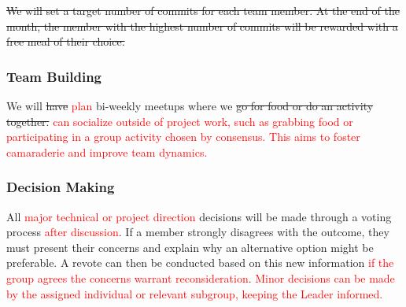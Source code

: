 \documentclass{article}
\begin{document}
\sout{We will set a target number of commits for each team member. At the end of the month, the member with the highest number of commits will be rewarded with a free meal of their choice.}

\subsubsection*{Team Building}
We will \sout{have} \textcolor{red}{plan} bi-weekly meetups where we \sout{go for food or do an activity together.} \textcolor{red}{can socialize outside of project work, such as grabbing food or participating in a group activity chosen by consensus. This aims to foster camaraderie and improve team dynamics.}

\subsubsection*{Decision Making}
All \textcolor{red}{major technical or project direction} decisions will be made through a voting process \textcolor{red}{after discussion}. If a member strongly disagrees with the outcome, they must present their concerns and explain why an alternative option might be preferable. A revote can then be conducted based on this new information \textcolor{red}{if the group agrees the concerns warrant reconsideration}. \textcolor{red}{Minor decisions can be made by the assigned individual or relevant subgroup, keeping the Leader informed.}
\end{document}
